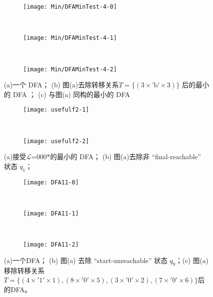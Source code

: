   \begin{figure}[!htbp]
    \centering
    \begin{subfigure}[b]{0.6\textwidth}
        \texttt{[image: Min/DFAMinTest-4-0]}
        \caption{}
        \label{fig:DFAMin-4-0}
    \end{subfigure}
    \\
    \begin{subfigure}[b]{0.6\textwidth}
        \texttt{[image: Min/DFAMinTest-4-1]}
        \caption{}
        \label{fig:DFAMin-4-1}
    \end{subfigure}
    \\
    \begin{subfigure}[b]{0.6\textwidth}
        \texttt{[image: Min/DFAMinTest-4-2]}
        \caption{}
        \label{fig:DFAMin-4-2}
    \end{subfigure}
    \caption{(a)一个 DFA； (b) 图(a)去除转移关系$T=\{(3 \times \mbox{'b'} \times 3)\}$ 后的最小的 DFA ； (c) 与图(a) 同构的最小的 DFA }
    \label{fig:DFAMin-4}
  \end{figure}

\begin{figure}[!htbp]
  \centering
  \begin{subfigure}[b]{0.35\textwidth}
      \texttt{[image: usefulf2-1]}
      \caption{}
      \label{fig:usefulf2-1}
  \end{subfigure}
  ~
  \begin{subfigure}[b]{0.35\textwidth}
      \texttt{[image: usefulf2-2]}
      \caption{}
      \label{fig:usefulf2-2}
  \end{subfigure}
  \caption{(a)接受{$\mathcal{L}$}=000*的最小的 DFA；  (b) 图(a)去除非 “final-reachable” 状态 {$q_1$}； }
  \label{fig:usefulf2-0}
\end{figure}


\begin{figure}[!htbp]
  \centering
  \begin{subfigure}[b]{0.6\textwidth}
      \texttt{[image: DFA11-0]}
      \caption{}
      \label{fig:DFA11-0}
  \end{subfigure}
  \\
  \begin{subfigure}[b]{0.6\textwidth}
      \texttt{[image: DFA11-1]}
      \caption{}
      \label{fig:DFA11-1}
  \end{subfigure}
  \\
  \begin{subfigure}[b]{0.6\textwidth}
      \texttt{[image: DFA11-2]}
      \caption{}
      \label{fig:DFA11-2}
  \end{subfigure}
  \caption{(a)一个DFA；  (b) 图(a) 去除 “start-unreachable” 状态 {$q_9$}；(c) 图(a)移除转移关系$T=\{(4 \times '1' \times 1),(8 \times '0' \times 5),(3 \times '0' \times 2),(7 \times '0' \times 6)\}$后的DFA。 }
  \label{fig:DFA11}
\end{figure}


